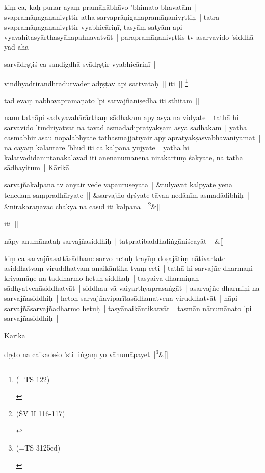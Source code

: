 \documentclass[article,12pt,a4paper]{memoir}
\begin{document}
	  \pstart kiṃ ca, kaḥ punar ayaṃ pramāṇābhāvo 'bhimato bhavatām | svapramāṇagaṇanivṛttir atha sarvaprāṇigaṇapramāṇanivṛttiḥ | tatra svapramāṇagaṇanivṛttir vyabhicāriṇī, tasyāṃ satyām api vyavahitasyārthasyānapahnavatvāt | parapramāṇanivṛttis tv asarvavido 'siddhā | yad āha 
	\pend
      

	  \pstart sarvādṛṣṭiś ca sandigdhā svādṛṣṭir vyabhicāriṇī | 
	\pend
      

	  \pstart vindhyādrirandhradūrvāder adṛṣṭāv api sattvataḥ || iti || \footnote{\begin{english}(=TS 122)\end{english}}
	\pend
      

	  \pstart tad evaṃ nābhāvapramāṇato 'pi sarvajñaniṣedha iti sthitam || 
	\pend
      

	  \pstart nanu tathāpi sadvyavahārārthaṃ sādhakam apy asya na vidyate | tathā hi sarvavido 'tīndriyatvāt na tāvad asmadādipratyakṣam asya sādhakam | yathā cāsmābhir asau nopalabhyate tathāsmajjātīyair apy apratyakṣasvabhāvaniyamāt | na cāyaṃ kālāntare 'bhūd iti ca kalpanā yujyate | yathā hi kālatvādidānīntanakālavad iti anenānumānena nirākartuṃ śakyate, na tathā sādhayitum | Kārikā 
	\pend
      
	    
	    \stanza[\smallbreak]
	sarvajñakalpanā tv anyair vede vāpauruṣeyatā | &tulyavat kalpyate yena tenedaṃ saṃpradhāryate || &sarvajño dṛśyate tāvan nedānīm asmadādibhiḥ | &nirākaraṇavac chakyā na cāsīd iti kalpanā ||\footnote{\begin{english}(ŚV II 116-117)\end{english}}\&[\smallbreak]


	

	  \pstart iti ||
	\pend
      
	    
	    \stanza[\smallbreak]
	nāpy anumānataḥ sarvajñasiddhiḥ | tatpratibaddhaliṅgāniścayāt | \&[\smallbreak]


	

	  \pstart kiṃ ca sarvajñasattāsādhane sarvo hetuḥ trayīṃ doṣajātiṃ nātivartate asiddhatvaṃ viruddhatvam anaikāntika-tvaṃ ceti | tathā hi sarvajñe dharmaṇi kriyamāṇe na taddharmo hetuḥ siddhaḥ | tasyaiva dharmiṇaḥ sādhyatvenāsiddhatvāt | siddhau vā vaiyarthyaprasaṅgāt | asarvajñe dharmiṇi na sarvajñasiddhiḥ | hetoḥ sarvajñaviparītasādhanatvena viruddhatvāt | nāpi sarvajñāsarvajñadharmo hetuḥ | tasyānaikāntikatvāt | tasmān nānumānato 'pi sarvajñasiddhiḥ | 
	\pend
      

	  \pstart Kārikā
	\pend
      
	    
	    \stanza[\smallbreak]
	dṛṣṭo na caikadeśo 'sti liṅgaṃ yo vānumāpayet |\footnote{\begin{english}(=TS 3125cd)\end{english}}\&[\smallbreak]
\end{document}
